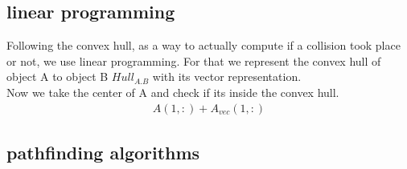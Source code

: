 \subsection{linear programming} %
Following the convex hull, as a way to actually compute if a collision took place or not, we use linear programming.
For that we represent the convex hull of object A to object B $Hull_{A.B}$ with its vector representation.\\
Now we take the center of A and check if its inside the convex hull.
\begin{align*}
A(1,:) + A_{vec}(1,:) 
\end{align*}

\subsection{pathfinding algorithms}

